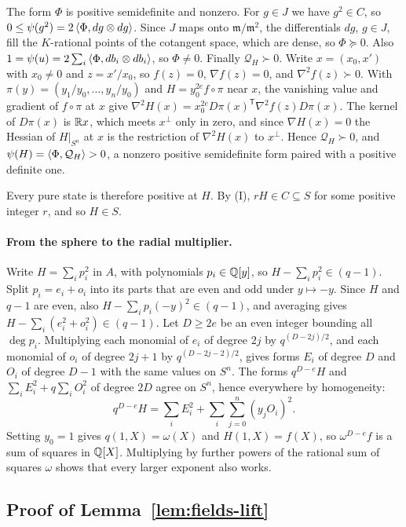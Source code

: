 The form $\Phi$ is positive semidefinite and nonzero. For $g\in J$ we have
$g^2\in C$, so $0\le\psi(g^2)=2\left\langle\Phi,dg\otimes dg\right\rangle$. Since $J$ maps onto
$\mathfrak m/\mathfrak m^2$, the differentials $dg$, $g\in J$, fill the
$K$-rational points of the cotangent space, which are dense, so
$\Phi\succeq0$. Also $1=\psi(u)=2\sum_i\left\langle\Phi,db_i\otimes db_i\right\rangle$, so
$\Phi\ne0$. Finally $\mathcal Q_H\succ0$. Write $x=(x_0,x')$ with $x_0\ne0$
and $z=x'/x_0$, so $f(z)=0$, $\nabla f(z)=0$, and $\nabla^2f(z)\succ0$. With
$\pi(y)=(y_1/y_0,\ldots,y_n/y_0)$ and $H=y_0^{2e}f\circ\pi$ near $x$, the
vanishing value and gradient of $f\circ\pi$ at $x$ give
$\nabla^2H(x)=x_0^{2e}D\pi(x)^{\mathsf T}\nabla^2f(z)D\pi(x)$. The kernel of
$D\pi(x)$ is $\mathbb R x$, which meets $x^\perp$ only in zero, and since
$\nabla H(x)=0$ the Hessian of $H|_{S^n}$ at $x$ is the restriction of
$\nabla^2H(x)$ to $x^\perp$. Hence $\mathcal Q_H\succ0$, and
$\psi(H)=\left\langle\Phi,\mathcal Q_H\right\rangle>0$, a nonzero positive semidefinite form
paired with a positive definite one.

Every pure state is therefore positive at $H$. By (I), $rH\in C\subseteq S$
for some positive integer $r$, and so $H\in S$.

\paragraph{From the sphere to the radial multiplier.}
Write $H=\sum_ip_i^2$ in $A$, with polynomials $p_i\in\mathbb Q[y]$, so
$H-\sum_ip_i^2\in(q-1)$. Split $p_i=e_i+o_i$ into its parts that are even and
odd under $y\mapsto-y$. Since $H$ and $q-1$ are even, also
$H-\sum_ip_i(-y)^2\in(q-1)$, and averaging gives
$H-\sum_i(e_i^2+o_i^2)\in(q-1)$. Let $D\ge2e$ be an even integer bounding all
$\deg p_i$. Multiplying each monomial of $e_i$ of degree $2j$ by
$q^{(D-2j)/2}$, and each monomial of $o_i$ of degree $2j+1$ by
$q^{(D-2j-2)/2}$, gives forms $E_i$ of degree $D$ and $O_i$ of degree $D-1$
with the same values on $S^n$. The forms $q^{D-e}H$ and
$\sum_iE_i^2+q\sum_iO_i^2$ of degree $2D$ agree on $S^n$, hence everywhere by
homogeneity:
\[
 q^{D-e}H=\sum_iE_i^2+\sum_i\sum_{j=0}^n(y_jO_i)^2 .
\]
Setting $y_0=1$ gives $q(1,X)=\omega(X)$ and $H(1,X)=f(X)$, so
$\omega^{D-e}f$ is a sum of squares in $\mathbb Q[X]$. Multiplying by further powers
of the rational sum of squares $\omega$ shows that every larger exponent also
works.

\subsection{Proof of Lemma~\ref{lem:fields-lift}}
\label{app:fields-lift}

